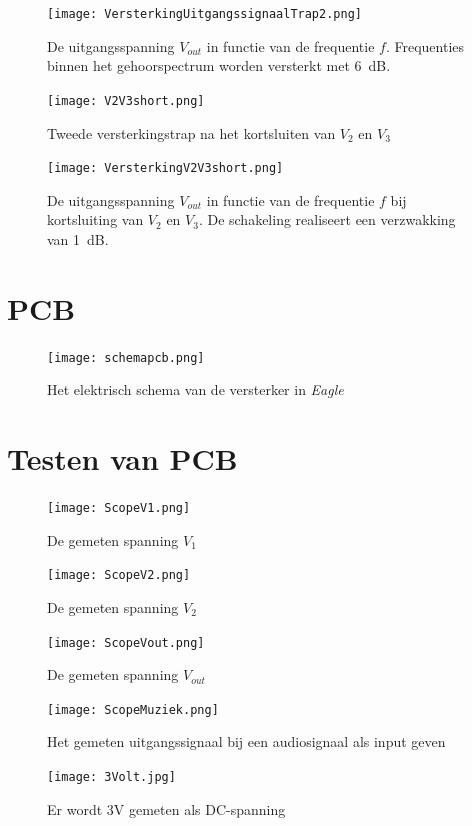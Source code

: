 \documentclass{report}
\begin{document}
\begin{appendices}
\begin{figure}[h]
	\centering
	\texttt{[image: VersterkingUitgangssignaalTrap2.png]}
	\caption{De uitgangsspanning $V_{out}$ in functie van de frequentie $f$. Frequenties binnen het gehoorspectrum worden versterkt met \SI{6}{\deci\bel}.}
	\label{versterkingtrap2SPICE}
\end{figure}
	
\begin{figure}[h]
	\centering
	\captionsetup{justification=centering}
	\texttt{[image: V2V3short.png]}
	\caption{Tweede versterkingstrap na het kortsluiten van $V_2$ en $V_3$}
	\label{V2V3short}
\end{figure}

\begin{figure}[h]
	\centering
	\texttt{[image: VersterkingV2V3short.png]}
	\caption{De uitgangsspanning $V_{out}$ in functie van de frequentie $f$ bij kortsluiting van $V_2$ en $V_3$. De schakeling realiseert een verzwakking van \SI{1}{\deci\bel}.}
	\label{V2V3shortresultaat}
\end{figure}
	

\chapter{PCB}
\label{pcb}
\begin{figure}[h]
	\centering
	\texttt{[image: schemapcb.png]}
	\caption{Het elektrisch schema van de versterker in \textit{Eagle}}
	\label{schemapcb}
\end{figure}

\chapter{Testen van PCB}

\begin{figure}[h]
	\centering
	\texttt{[image: ScopeV1.png]}
	\caption{De gemeten spanning \(V_{1}\)}
	\label{scopev1}
\end{figure}
\begin{figure}[h]
	\centering
	\texttt{[image: ScopeV2.png]}
	\caption{De gemeten spanning \(V_{2}\)}
	\label{scopev2}
\end{figure}
\begin{figure}[h]
	\centering
	\texttt{[image: ScopeVout.png]}
	\caption{De gemeten spanning \(V_{out}\)}
	\label{scopevout}
\end{figure}

\begin{figure}[h]
	\centering
	\texttt{[image: ScopeMuziek.png]}
	\caption{Het gemeten uitgangssignaal bij een audiosignaal als input geven}
	\label{scopemuziek}
\end{figure}
\begin{figure}[h]
	\centering
	\texttt{[image: 3Volt.jpg]}
	\caption{Er wordt 3\si{\V} gemeten als DC-spanning}
	\label{3volt}
\end{figure}

\end{appendices}
\end{document}
